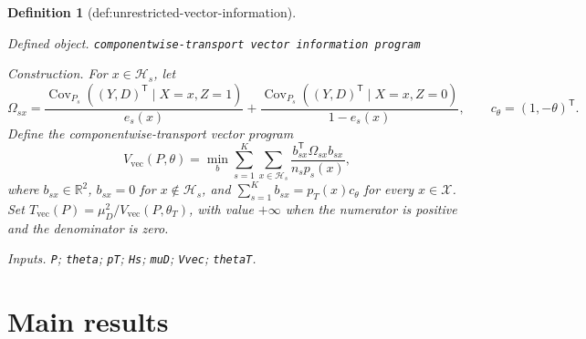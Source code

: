 \documentclass{article}
\newtheorem{definition}{Definition}
\begin{document}
\begin{definition}[def:unrestricted-vector-information]\label{def:unrestricted-vector-information}
\par\smallskip\noindent\emph{Defined object.} \texttt{componentwise-\allowbreak{}transport vector information program}
\par\smallskip\noindent\emph{Construction.} For \(x\in\mathcal H_s\), let
\[
\Omega_{sx}=
\frac{\operatorname{Cov}_{P_s}((Y,D)^{\mathsf T}\mid X=x,Z=1)}{e_s(x)}
+\frac{\operatorname{Cov}_{P_s}((Y,D)^{\mathsf T}\mid X=x,Z=0)}{1-e_s(x)},
\qquad c_\theta=(1,-\theta)^{\mathsf T}.
\]
Define the componentwise-transport vector program
\[
V_{\mathrm{vec}}(P,\theta)=
\min_b\sum_{s=1}^K\sum_{x\in\mathcal H_s}
\frac{b_{sx}^{\mathsf T}\Omega_{sx}b_{sx}}{n_sp_s(x)},
\]
where \(b_{sx}\in\mathbb R^2\), \(b_{sx}=0\) for \(x\notin\mathcal H_s\), and
\(\sum_{s=1}^K b_{sx}=p_T(x)c_\theta\) for every \(x\in\mathcal X\). Set
\(T_{\mathrm{vec}}(P)=\mu_D^2/V_{\mathrm{vec}}(P,\theta_T)\), with value \(+\infty\) when the numerator is positive and the denominator is zero.
\par\smallskip\noindent\emph{Inputs.} \texttt{P}; \texttt{theta}; \texttt{pT}; \texttt{Hs}; \texttt{muD}; \texttt{Vvec}; \texttt{thetaT}.
\end{definition}

\section{Main results}
\end{document}
